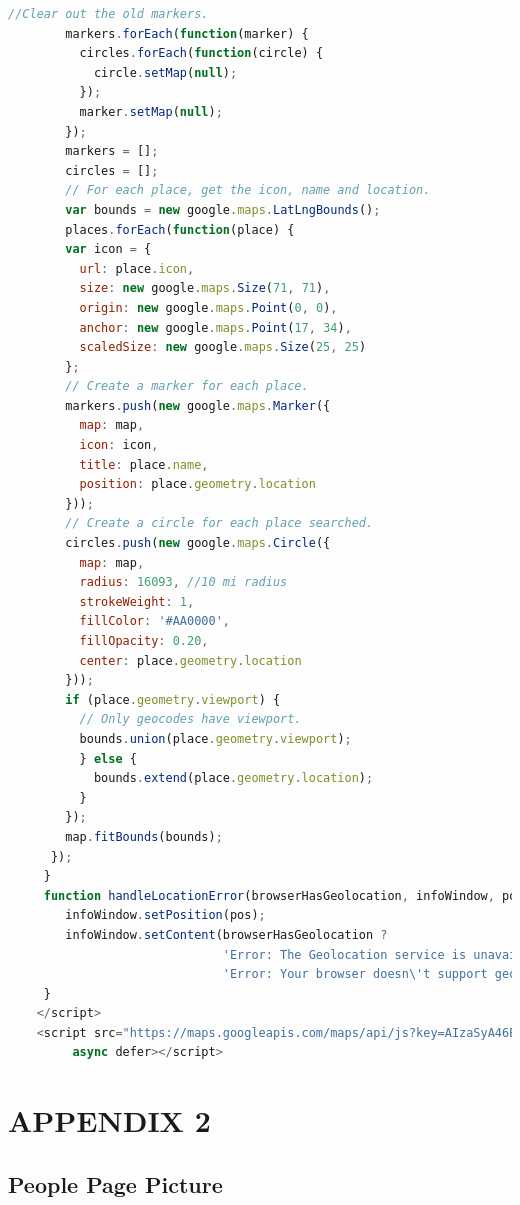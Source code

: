 \documentclass[draftclsnofoot,10pt,onecolumn]{IEEEtran} %
\begin{document}
\begin{center}
\begin{lstlisting}[caption=eventSearch.html showing JavaScript that creates
  the map for the events search, language=JavaScript]
        //Clear out the old markers.
        markers.forEach(function(marker) {
          circles.forEach(function(circle) {
            circle.setMap(null);
          });
          marker.setMap(null);
        });
        markers = [];
        circles = [];
        // For each place, get the icon, name and location.
        var bounds = new google.maps.LatLngBounds();
        places.forEach(function(place) {
        var icon = {
          url: place.icon,
          size: new google.maps.Size(71, 71),
          origin: new google.maps.Point(0, 0),
          anchor: new google.maps.Point(17, 34),
          scaledSize: new google.maps.Size(25, 25)
        };
        // Create a marker for each place.
        markers.push(new google.maps.Marker({
          map: map,
          icon: icon,
          title: place.name,
          position: place.geometry.location
        }));
        // Create a circle for each place searched.
        circles.push(new google.maps.Circle({
          map: map,
          radius: 16093, //10 mi radius
          strokeWeight: 1,
          fillColor: '#AA0000',
          fillOpacity: 0.20,
          center: place.geometry.location
        }));
        if (place.geometry.viewport) {
          // Only geocodes have viewport.
          bounds.union(place.geometry.viewport);
          } else {
            bounds.extend(place.geometry.location);
          }
        });
        map.fitBounds(bounds);
      });
     }
     function handleLocationError(browserHasGeolocation, infoWindow, pos) {
        infoWindow.setPosition(pos);
        infoWindow.setContent(browserHasGeolocation ?
                              'Error: The Geolocation service is unavailable.' :
                              'Error: Your browser doesn\'t support geolocation.');
     }
    </script>
    <script src="https://maps.googleapis.com/maps/api/js?key=AIzaSyA46B8dAoEQyc1tdHK89306TdQD_Ox6iw0&libraries=places&sensor=true&callback=initMap"
         async defer></script> 
  \end{lstlisting}
\end{center}
    
\section{APPENDIX 2}

\subsection{People Page Picture}
\end{document}
